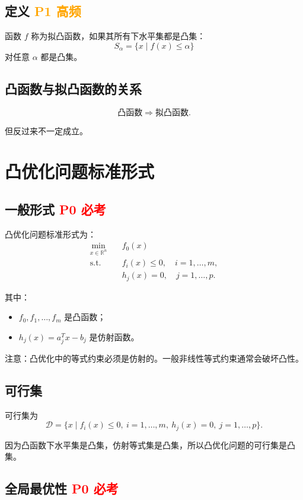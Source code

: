 \documentclass[11pt,a4paper]{ctexart}
\newcommand{\R}{\mathbb{R}}
\newcommand{\st}{\text{s.t.}}
\newcommand{\Pzero}{\textcolor{red}{\textbf{P0 必考}}}
\newcommand{\Pone}{\textcolor{orange}{\textbf{P1 高频}}}
\theoremstyle{definition}
\theoremstyle{plain}
\theoremstyle{remark}
\begin{document}
\subsection{定义 \Pone}

函数 $f$ 称为拟凸函数，如果其所有下水平集都是凸集：
\[
    S_\alpha = \{x\mid f(x)\le \alpha\}
\]
对任意 $\alpha$ 都是凸集。

\subsection{凸函数与拟凸函数的关系}

\[
    \text{凸函数} \Longrightarrow \text{拟凸函数}.
\]

但反过来不一定成立。

\section{凸优化问题标准形式}

\subsection{一般形式 \Pzero}

凸优化问题标准形式为：
\[
\begin{aligned}
    \min_{x\in\R^n}\quad & f_0(x) \\
    \st\quad & f_i(x)\le 0,\quad i=1,\dots,m,\\
    & h_j(x)=0,\quad j=1,\dots,p.
\end{aligned}
\]

其中：
\begin{itemize}
    \item $f_0,f_1,\dots,f_m$ 是凸函数；
    \item $h_j(x)=a_j^T x-b_j$ 是仿射函数。
\end{itemize}

注意：凸优化中的等式约束必须是仿射的。一般非线性等式约束通常会破坏凸性。

\subsection{可行集}

可行集为
\[
    \mathcal{D} =
    \{x\mid f_i(x)\le0,\ i=1,\dots,m,\ h_j(x)=0,\ j=1,\dots,p\}.
\]

因为凸函数下水平集是凸集，仿射等式集是凸集，所以凸优化问题的可行集是凸集。

\subsection{全局最优性 \Pzero}
\end{document}
